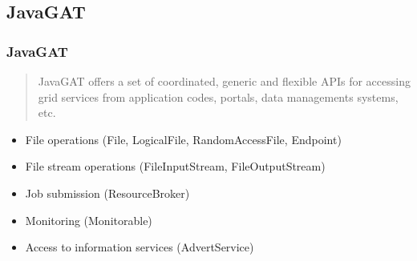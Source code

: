 \documentclass{beamer}
\begin{document}
\subsection{JavaGAT}
\frame
{
	\frametitle{JavaGAT}
	\begin{quote}
		JavaGAT offers a set of coordinated, generic and flexible APIs for accessing
		grid services from application codes, portals, data managements systems, etc.
	\end{quote}
	
	\begin{itemize}
		\item File operations (File, LogicalFile, RandomAccessFile, Endpoint)
		\item File stream operations (FileInputStream, FileOutputStream)
		\item Job submission (ResourceBroker)
		\item Monitoring (Monitorable)
		\item Access to information services (AdvertService)
	\end{itemize}
}


\end{document}
